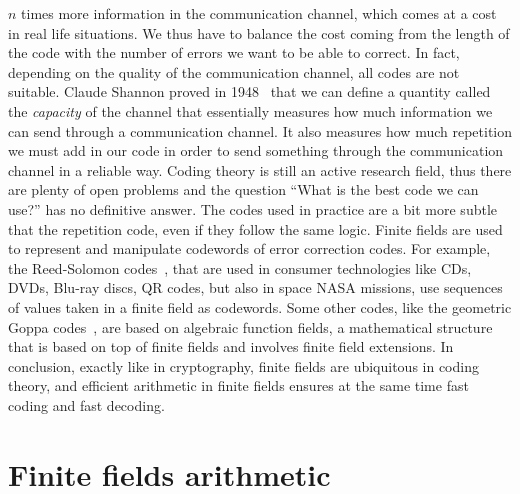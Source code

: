 $n$ times more information in the communication channel, which comes at a cost
in real life situations. We thus have to balance the cost coming from the length
of the code with the number of errors we want to be able to correct. In fact,
depending on the quality of the communication channel, all codes are not
suitable. Claude Shannon proved in
1948~\cite{Shannon48} that we can define a quantity called the \emph{capacity}
of the channel that essentially measures how much information we can send
through a communication channel. It also measures how much repetition we
must add in our code in order to send something through the communication
channel in a reliable way. Coding theory is still an active research field, thus
there are plenty of open problems and the question ``What is the best code we
can use?'' has no definitive answer. The codes used in practice
are a bit more subtle that the repetition code, even if they follow the same
logic. Finite fields are used to represent and manipulate codewords of error
correction codes. For example, the Reed-Solomon codes~\cite{RS60}, that are used
in consumer technologies like CDs, DVDs, Blu-ray discs, QR codes, but also in
space NASA missions, use sequences of values taken in a finite field as
codewords. Some other codes, like the geometric Goppa codes~\cite{Goppa81}, are
based on algebraic function fields, a mathematical structure that is based on
top of finite fields and involves finite field extensions.
In conclusion, exactly like in cryptography, finite fields are
ubiquitous in coding theory, and efficient arithmetic in finite fields ensures
at the same time fast coding and fast decoding.

\section{Finite fields arithmetic}

